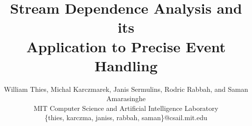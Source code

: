 \documentclass{sig-alternate}
\title{Stream Dependence Analysis and its \\ Application to Precise Event Handling}
\author{
	William Thies, Michal Karczmarek, Janis Sermulins, Rodric Rabbah, and Saman Amarasinghe\\
	\small MIT Computer Science and Artificial Intelligence Laboratory\\
	\small \{thies, karczma, janiss, rabbah, saman\}@csail.mit.edu
}
\begin{document}
\newtheorem{definition}{Definition}
\newtheorem{theorem}{Theorem}
\newtheorem{algorithm}{Algorithm}

\maketitle

\newcommand{\figsdep}[0]{\mt{SDEP}}
\newcommand{\figsdepf}[2]{\mt{SDEP}_{#1 \small{\leftarrow} #2}}
\newcommand{\sdep}[0]{\textsc{sdep}}
\newcommand{\sdepf}[2]{\sdep_{#1 \small{\leftarrow} #2}}
\newcommand{\floor}[2]{\left\lfloor\frac{#1}{#2}\right\rfloor}
\newcommand{\ceil}[2]{\left\lceil\frac{#1}{#2}\right\rceil}

\newcommand{\mt}[1]{\mbox{\it #1}}
\newcommand{\todo}[1]{\framebox{\bf #1}}
\newcommand{\naive}[0]{na\"{\i}ve}
\newcommand{\Naive}[0]{Na\"{\i}ve}
\newcommand{\makeline}[0]{\rule{0cm}{0cm}\\\hrule\rule{0cm}{0cm}}

\begin{abstract}

\end{abstract}






%



{\small
  
  
}


%


\clearpage
%
\clearpage
%
\end{document}
